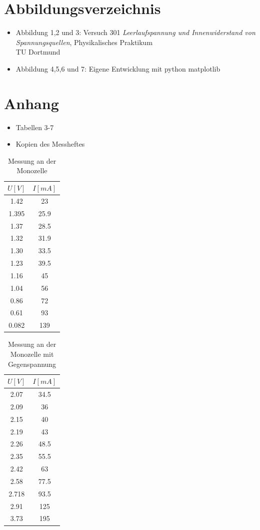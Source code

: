 \documentclass[11pt]{article}
\begin{document}
 \newpage
\section{Abbildungsverzeichnis}
\begin{itemize}
\item Abbildung 1,2 und 3: Versuch 301 \textit{Leerlaufspannung und Innenwiderstand von Spannungsquellen}, Physikalisches Praktikum\\ TU Dortmund
\item Abbildung 4,5,6 und 7: Eigene Entwicklung mit python matplotlib
\end{itemize}
\section{Anhang}
\begin{itemize}
\item Tabellen 3-7
\item Kopien des Messheftes
\end{itemize}
\begin{table}[h]
 \centering

 \begin{tabular}{|c|c|}
  \hline
  $U[V]$ & $I[mA]$  \\
  \hline
  1.42 & 23 \\
  1.395 & 25.9 \\
  1.37& 28.5 \\
  1.32 & 31.9 \\
  1.30 & 33.5\\
  1.23 & 39.5\\
  1.16 & 45 \\
  1.04 & 56\\
  0.86 & 72\\
  0.61 & 93\\
  0.082 & 139\\
  \hline
 \end{tabular}
  \caption{Messung an der Monozelle}
 \label{Messung 1}
 \end{table}
 
 
 \begin{table}[h]
 \centering
 \begin{tabular}{|c|c|}
  \hline
  $U[V]$ & $I[mA]$  \\
  \hline
  2.07 & 34.5 \\
  2.09 & 36 \\
  2.15 & 40 \\
  2.19 & 43 \\
  2.26 & 48.5\\
  2.35 & 55.5\\
  2.42 & 63 \\
  2.58 & 77.5\\
  2.718 & 93.5\\
  2.91 & 125\\
  3.73 & 195\\
  \hline
 \end{tabular}
  \caption{Messung an der Monozelle mit Gegenspannung}
 \label{Messung 2}
 \end{table}
 
\end{document}
